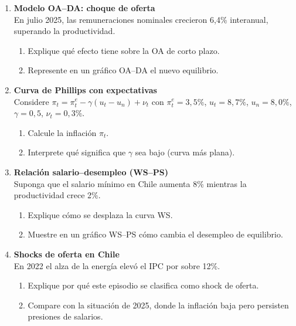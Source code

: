 \documentclass[11pt,addpoints]{article}
\begin{document}
\begin{enumerate}
\item \textbf{Modelo OA--DA: choque de oferta}\\
En julio 2025, las remuneraciones nominales crecieron 6,4\% interanual, superando la productividad.
\begin{enumerate}[label=(\alph*)]
\item Explique qué efecto tiene sobre la OA de corto plazo.
\item Represente en un gráfico OA--DA el nuevo equilibrio.
\end{enumerate}

\item \textbf{Curva de Phillips con expectativas}\\
Considere $\pi_t = \pi_t^e - \gamma(u_t - u_n) + \nu_t$ con $\pi_t^e=3{,}5\%$, $u_t=8{,}7\%$, $u_n=8{,}0\%$, $\gamma=0{,}5$, $\nu_t=0{,}3\%$.
\begin{enumerate}[label=(\alph*)]
\item Calcule la inflación $\pi_t$.
\item Interprete qué significa que $\gamma$ sea bajo (curva más plana).
\end{enumerate}

\item \textbf{Relación salario--desempleo (WS--PS)}\\
Suponga que el salario mínimo en Chile aumenta 8\% mientras la productividad crece 2\%.
\begin{enumerate}[label=(\alph*)]
\item Explique cómo se desplaza la curva WS.
\item Muestre en un gráfico WS--PS cómo cambia el desempleo de equilibrio.
\end{enumerate}

\item \textbf{Shocks de oferta en Chile}\\
En 2022 el alza de la energía elevó el IPC por sobre 12\%.
\begin{enumerate}[label=(\alph*)]
\item Explique por qué este episodio se clasifica como shock de oferta.
\item Compare con la situación de 2025, donde la inflación baja pero persisten presiones de salarios.
\end{enumerate}

\newpage %
\vspace*{0.1cm} %



\end{enumerate}
\end{document}
